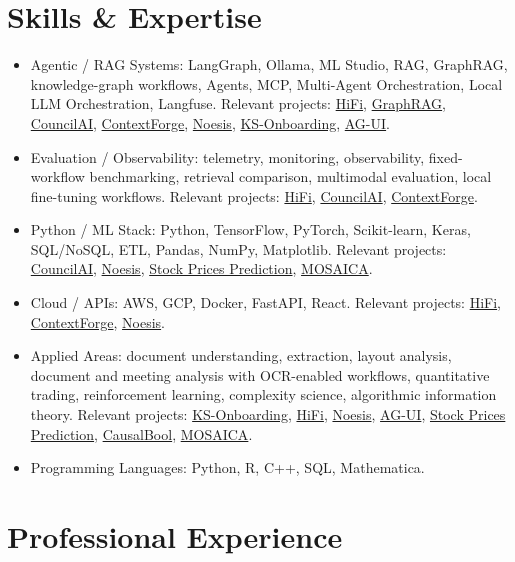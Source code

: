 \documentclass{article}
\begin{document}
\section{Skills \& Expertise}
\begin{itemize}
\item Agentic / RAG Systems: LangGraph, Ollama, ML Studio, RAG, GraphRAG, knowledge-graph workflows, Agents, MCP, Multi-Agent Orchestration, Local LLM Orchestration, Langfuse. Relevant projects: \hyperlink{proj-hifi}{HiFi}, \hyperlink{proj-graphrag}{GraphRAG}, \hyperlink{proj-councilai}{CouncilAI}, \hyperlink{proj-contextforge}{ContextForge}, \hyperlink{proj-noesis}{Noesis}, \hyperlink{proj-ksonboarding}{KS-Onboarding}, \hyperlink{proj-agui}{AG-UI}.
\item Evaluation / Observability: telemetry, monitoring, observability, fixed-workflow benchmarking, retrieval comparison, multimodal evaluation, local fine-tuning workflows. Relevant projects: \hyperlink{proj-hifi}{HiFi}, \hyperlink{proj-councilai}{CouncilAI}, \hyperlink{proj-contextforge}{ContextForge}.
\item Python / ML Stack: Python, TensorFlow, PyTorch, Scikit-learn, Keras, SQL/NoSQL, ETL, Pandas, NumPy, Matplotlib. Relevant projects: \hyperlink{proj-councilai}{CouncilAI}, \hyperlink{proj-noesis}{Noesis}, \hyperlink{proj-stock}{Stock Prices Prediction}, \hyperlink{proj-mosaica}{MOSAICA}.
\item Cloud / APIs: AWS, GCP, Docker, FastAPI, React. Relevant projects: \hyperlink{proj-hifi}{HiFi}, \hyperlink{proj-contextforge}{ContextForge}, \hyperlink{proj-noesis}{Noesis}.
\item Applied Areas: document understanding, extraction, layout analysis, document and meeting analysis with OCR-enabled workflows, quantitative trading, reinforcement learning, complexity science, algorithmic information theory. Relevant projects: \hyperlink{proj-ksonboarding}{KS-Onboarding}, \hyperlink{proj-hifi}{HiFi}, \hyperlink{proj-noesis}{Noesis}, \hyperlink{proj-agui}{AG-UI}, \hyperlink{proj-stock}{Stock Prices Prediction}, \hyperlink{proj-causalbool}{CausalBool}, \hyperlink{proj-mosaica}{MOSAICA}.
\item Programming Languages: Python, R, C++, SQL, Mathematica.
\end{itemize}

\section{Professional Experience}
\end{document}
